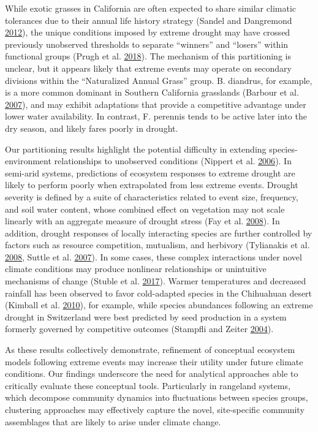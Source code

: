 \documentclass[twoside,12pt,final]{ucthesis-CA2012}
\begin{document}
\begin{ucmainmatter}
While exotic grasses in California are often expected to share similar climatic tolerances due to their annual life history strategy (Sandel and Dangremond \protect\hyperlink{ref-Sandel2012}{2012}), the unique conditions imposed by extreme drought may have crossed previously unobserved thresholds to separate ``winners'' and ``losers'' within functional groups (Prugh et al. \protect\hyperlink{ref-Prugh2018}{2018}).
The mechanism of this partitioning is unclear, but it appears likely that extreme events may operate on secondary divisions within the ``Naturalized Annual Grass'' group.
B. diandrus, for example, is a more common dominant in Southern California grasslands (Barbour et al. \protect\hyperlink{ref-Barbour2007}{2007}), and may exhibit adaptations that provide a competitive advantage under lower water availability.
In contrast, F. perennis tends to be active later into the dry season, and likely fares poorly in drought.

Our partitioning results highlight the potential difficulty in extending species-environment relationships to unobserved conditions (Nippert et al. \protect\hyperlink{ref-Nippert2006}{2006}).
In semi-arid systems, predictions of ecosystem responses to extreme drought are likely to perform poorly when extrapolated from less extreme events.
Drought severity is defined by a suite of characteristics related to event size, frequency, and soil water content, whose combined effect on vegetation may not scale linearly with an aggregate measure of drought stress (Fay et al. \protect\hyperlink{ref-Fay2008}{2008}).
In addition, drought responses of locally interacting species are further controlled by factors such as resource competition, mutualism, and herbivory (Tylianakis et al. \protect\hyperlink{ref-Tylianakis2008}{2008}, Suttle et al. \protect\hyperlink{ref-Suttle2007}{2007}).
In some cases, these complex interactions under novel climate conditions may produce nonlinear relationships or unintuitive mechanisms of change (Stuble et al. \protect\hyperlink{ref-Stuble2017}{2017}).
Warmer temperatures and decreased rainfall has been observed to favor cold-adapted species in the Chihuahuan desert (Kimball et al. \protect\hyperlink{ref-Kimball2010}{2010}), for example, while species abundances following an extreme drought in Switzerland were best predicted by seed production in a system formerly governed by competitive outcomes (Stampfli and Zeiter \protect\hyperlink{ref-Stampfli2004}{2004}).

As these results collectively demonstrate, refinement of conceptual ecosystem models following extreme events may increase their utility under future climate conditions.
Our findings underscore the need for analytical approaches able to critically evaluate these conceptual tools.
Particularly in rangeland systems, which decompose community dynamics into fluctuations between species groups, clustering approaches may effectively capture the novel, site-specific community assemblages that are likely to arise under climate change.


\end{ucmainmatter}
\end{document}
